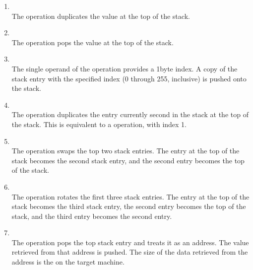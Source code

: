 \begin{enumerate}[1]
\item {} \\
The  operation duplicates the value at the top of the stack.

\item {} \\
The  operation pops the value at the top of the stack.

\item {} \\
The single operand of the  operation provides a
1\dash byte index. A copy of the stack entry with the specified
index (0 through 255, inclusive) is pushed onto the stack.

\item {} \\
The  operation duplicates the entry currently second
in the stack at the top of the stack. 
This is equivalent to
a  operation, with index 1.  

\item {} \\
The  operation swaps the top two stack entries. 
The entry at the top of the
stack becomes the second stack entry, 
and the second entry becomes the top of the stack.

\item {} \\
The  operation rotates the first three stack
entries. The entry at the top of the stack becomes the third
stack entry, the second entry becomes the top of the stack,
and the third entry becomes the second entry.

\item  {} \\
The 
operation 
pops the top stack entry and 
treats it as an address. The value
retrieved from that address is pushed. 
The size of the data retrieved from the 
address is the  on the target machine.


\end{enumerate}
